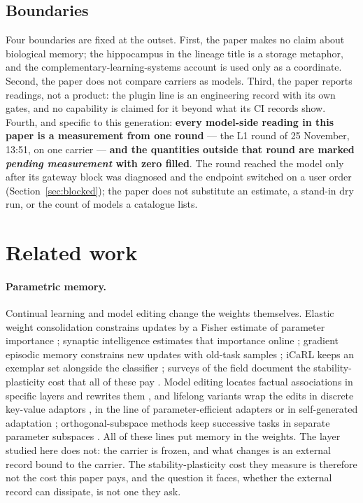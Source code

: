\documentclass[11pt,a4paper]{article}
\begin{document}
\subsection{Boundaries}
Four boundaries are fixed at the outset. First, the paper makes no claim about biological memory; the hippocampus in the lineage title is a storage metaphor, and the complementary-learning-systems account \citep{mcclelland1995,kumaran2016} is used only as a coordinate. Second, the paper does not compare carriers as models. Third, the paper reports readings, not a product: the plugin line is an engineering record with its own gates, and no capability is claimed for it beyond what its CI records show. Fourth, and specific to this generation: \textbf{every model-side reading in this paper is a measurement from one round} --- the L1 round of 25 November, 13:51, on one carrier --- \textbf{and the quantities outside that round are marked \emph{pending measurement} with zero filled}. The round reached the model only after its gateway block was diagnosed and the endpoint switched on a user order (Section~\ref{sec:blocked}); the paper does not substitute an estimate, a stand-in dry run, or the count of models a catalogue lists.

\section{Related work}
\label{sec:related}

\paragraph{Parametric memory.}
Continual learning and model editing change the weights themselves. Elastic weight consolidation constrains updates by a Fisher estimate of parameter importance \citep{ewc2017}; synaptic intelligence estimates that importance online \citep{si2017}; gradient episodic memory constrains new updates with old-task samples \citep{gem2017}; iCaRL keeps an exemplar set alongside the classifier \citep{icarl2017}; surveys of the field document the stability-plasticity cost that all of these pay \citep{dewange2022,shi2024,wu2024}. Model editing locates factual associations in specific layers and rewrites them \citep{rome2022,memit2023,ke2021}, and lifelong variants wrap the edits in discrete key-value adaptors \citep{grace2023}, in the line of parameter-efficient adapters \citep{houlsby2019} or in self-generated adaptation \citep{seal2025}; orthogonal-subspace methods keep successive tasks in separate parameter subspaces \citep{olora2023}. All of these lines put memory in the weights. The layer studied here does not: the carrier is frozen, and what changes is an external record bound to the carrier. The stability-plasticity cost they measure is therefore not the cost this paper pays, and the question it faces, whether the external record can dissipate, is not one they ask.
\end{document}
